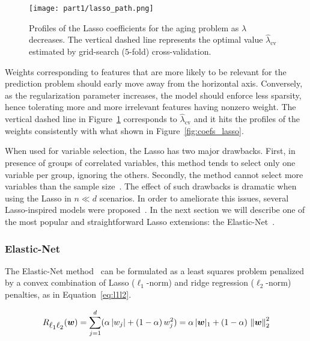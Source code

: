 			\begin{figure}[]
				\centering
				\texttt{[image: part1/lasso\_path.png]}
				\caption{Profiles of the Lasso coefficients for the aging problem as $\lambda$ decreases. The vertical dashed line represents the optimal value $\hat \lambda_{\text{cv}}$ estimated by grid-search ($5$-fold) cross-validation.} \label{fig:lasso_path}
			\end{figure}
		
			Weights corresponding to features that are more likely to be relevant for the prediction problem should early move away from the horizontal axis. Conversely, as the regularization parameter increases, the model should enforce less sparsity, hence tolerating more and more irrelevant features having nonzero weight. The vertical dashed line in Figure~\ref{fig:lasso_path} corresponds to $\hat \lambda_{\text{cv}}$ and it hits the profiles of the weights consistently with what shown in Figure~\ref{fig:coefs_lasso}.

			When used for variable selection, the Lasso has two major drawbacks. First, in presence of groups of correlated variables, this method tends to select only one variable per group, ignoring the others. Secondly, the method cannot select more variables than the sample size~\cite{waldmann2013evaluation, de2009regularized}.
			The effect of such drawbacks is dramatic when using the Lasso in $n \ll d$ scenarios.
			In order to ameliorate this issues, several Lasso-inspired models were proposed~\cite{meinshausen2010stability, hoggart2008simultaneous, zou2006adaptive}.
			In the next section we will describe one of the most popular and straightforward Lasso extensions: the Elastic-Net~\cite{zou2005regularization}.

			\subsubsection{Elastic-Net} \label{sec:elastic_net}
			The Elastic-Net method~\cite{zou2005regularization, de2009elastic} can be formulated as a least squares problem penalized by a convex combination of Lasso ($\ell_1$-norm) and ridge regression ($\ell_2$-norm) penalties, as in Equation~\eqref{eq:l1l2}.

			\begin{equation}\label{eq:l1l2}
				R_{\mbox{$\ell_1\ell_2$}}(\bm{w}) = \sum_{j=1}^d (\alpha\,|w_j| + (1-\alpha)\,w_j^2) = \alpha\,|\bm{w}|_1 + (1-\alpha)\,\left\lVert\bm{w}\right\rVert_2^2
			\end{equation}

